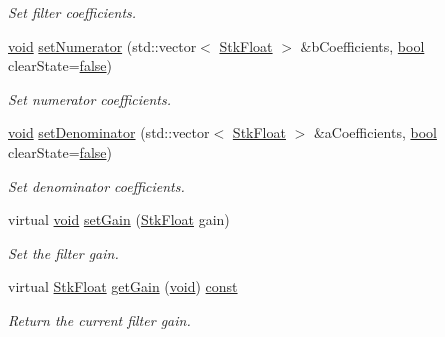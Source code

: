 \begin{DoxyCompactItemize}
\begin{DoxyCompactList}\small\item\em Set filter coefficients. \end{DoxyCompactList}\item 
\hyperlink{sound_8c_ae35f5844602719cf66324f4de2a658b3}{void} \hyperlink{class_nyq_1_1_filter_a2d77f0e8f27c8ca0206258e7523a7720}{set\+Numerator} (std\+::vector$<$ \hyperlink{namespace_nyq_a044fa20a706520a617bbbf458a7db7e4}{Stk\+Float} $>$ \&b\+Coefficients, \hyperlink{mac_2config_2i386_2lib-src_2libsoxr_2soxr-config_8h_abb452686968e48b67397da5f97445f5b}{bool} clear\+State=\hyperlink{mac_2config_2i386_2lib-src_2libsoxr_2soxr-config_8h_a65e9886d74aaee76545e83dd09011727}{false})
\begin{DoxyCompactList}\small\item\em Set numerator coefficients. \end{DoxyCompactList}\item 
\hyperlink{sound_8c_ae35f5844602719cf66324f4de2a658b3}{void} \hyperlink{class_nyq_1_1_filter_a5409f79d7e685a95ca6926f4d854dbe4}{set\+Denominator} (std\+::vector$<$ \hyperlink{namespace_nyq_a044fa20a706520a617bbbf458a7db7e4}{Stk\+Float} $>$ \&a\+Coefficients, \hyperlink{mac_2config_2i386_2lib-src_2libsoxr_2soxr-config_8h_abb452686968e48b67397da5f97445f5b}{bool} clear\+State=\hyperlink{mac_2config_2i386_2lib-src_2libsoxr_2soxr-config_8h_a65e9886d74aaee76545e83dd09011727}{false})
\begin{DoxyCompactList}\small\item\em Set denominator coefficients. \end{DoxyCompactList}\item 
virtual \hyperlink{sound_8c_ae35f5844602719cf66324f4de2a658b3}{void} \hyperlink{class_nyq_1_1_filter_af8b8c7ecd8b59f32214f012ee565969d}{set\+Gain} (\hyperlink{namespace_nyq_a044fa20a706520a617bbbf458a7db7e4}{Stk\+Float} gain)
\begin{DoxyCompactList}\small\item\em Set the filter gain. \end{DoxyCompactList}\item 
virtual \hyperlink{namespace_nyq_a044fa20a706520a617bbbf458a7db7e4}{Stk\+Float} \hyperlink{class_nyq_1_1_filter_a12e7708f197b10e2480d1c23ec7179fd}{get\+Gain} (\hyperlink{sound_8c_ae35f5844602719cf66324f4de2a658b3}{void}) \hyperlink{getopt1_8c_a2c212835823e3c54a8ab6d95c652660e}{const} 
\begin{DoxyCompactList}\small\item\em Return the current filter gain. \end{DoxyCompactList}\item 

\end{DoxyCompactItemize}
